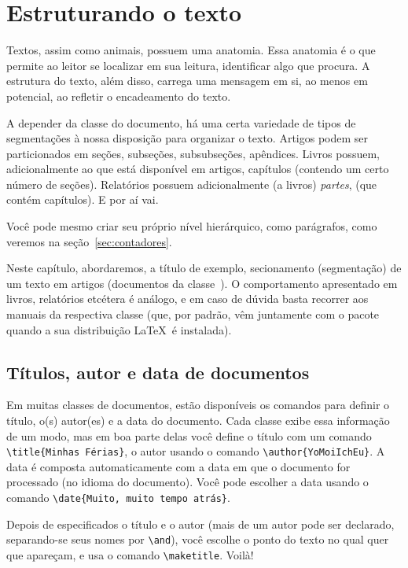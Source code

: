 \section{Estruturando o texto}

Textos, assim como animais, possuem uma anatomia. Essa anatomia é o que permite ao leitor se localizar em sua leitura, identificar algo que procura. A estrutura do texto, além disso, carrega uma mensagem em si, ao menos em potencial, ao refletir o encadeamento do texto.

A depender da classe do documento, há uma certa variedade de tipos de segmentações à nossa disposição para organizar o texto.
Artigos podem ser particionados em seções, subseções, subsubseções, apêndices.
Livros possuem, adicionalmente ao que está disponível em artigos, capítulos (contendo um certo número de seções).
Relatórios possuem adicionalmente (a livros) \emph{partes}, (que contém capítulos).
E por aí vai.

Você pode mesmo criar seu próprio nível hierárquico, como parágrafos, como veremos na seção~\ref{sec:contadores}.

Neste capítulo, abordaremos, a título de exemplo, secionamento (segmentação) de um texto em artigos (documentos da classe~). O comportamento apresentado em livros, relatórios etcétera é análogo, e em caso de dúvida basta recorrer aos manuais da respectiva classe (que, por padrão, vêm juntamente com o pacote quando a sua distribuição \LaTeX\ é instalada).

\subsection{Títulos, autor e data de documentos}

Em muitas classes de documentos, estão disponíveis os comandos para
definir o título, o(s) autor(es) e a data do documento. Cada classe
exibe essa informação de um modo, mas em boa parte delas você define o
título com um comando \verb'\title{Minhas Férias}', o autor usando o
comando \verb'\author{YoMoiIchEu}'. A data é composta automaticamente
com a data em que o documento for processado (no idioma do
documento). Você pode escolher a data usando o comando
\verb'\date{Muito, muito tempo atrás}'.

Depois de especificados o título e o autor (mais de um autor pode ser
declarado, separando-se seus nomes por \verb'\and'), você escolhe o
ponto do texto no qual quer que apareçam, e usa o comando
\verb'\maketitle'. Voilà!

